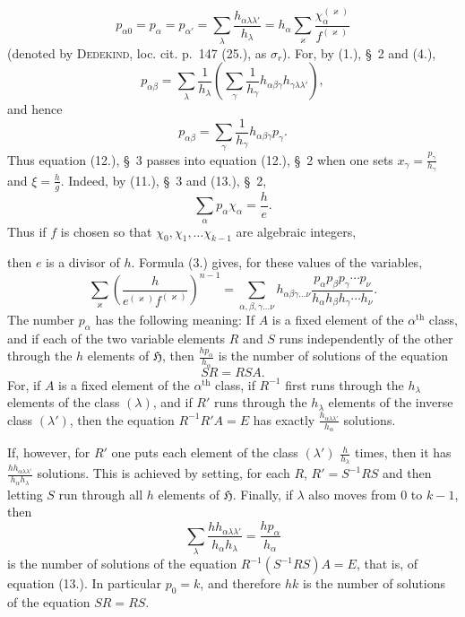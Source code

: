 \documentclass[11pt]{article}
\newcommand{\grp}{\mathfrak{H}}
\begin{document}
\begin{equation*}\tag{9.}
p_{\alpha0}=p_\alpha=p_{\alpha'}=\sum_\lambda\frac{h_{\alpha\lambda\lambda'}}{h_\lambda}=h_\alpha\sum_\varkappa\frac{\chi_\alpha^{(\varkappa)}}{f^{(\varkappa)}}
\end{equation*}
(denoted by \textsc{Dedekind}, loc. cit. p.~147 (25.), as $\sigma_r$). For, by (1.), \S~2 and (4.),
\[
p_{\alpha\beta}=\sum_\lambda\frac{1}{h_\lambda}\left(\sum_\gamma\frac{1}{h_\gamma}h_{\alpha\beta\gamma}h_{\gamma\lambda\lambda'}\right),
\]
and hence
\begin{equation*}\tag{10.}
p_{\alpha\beta}=\sum_\gamma\frac{1}{h_\gamma}h_{\alpha\beta\gamma}p_\gamma.
\end{equation*}
Thus equation (12.), \S~3 passes into equation (12.), \S~2 when one sets $x_\gamma=\frac{p_\gamma}{h_\gamma}$ and $\xi=\frac{h}{g}$. Indeed, by (11.), \S~3 and (13.), \S~2,
\begin{equation*}\tag{11.}
\sum_\alpha p_\alpha\chi_\alpha=\frac{h}{e}.
\end{equation*}
Thus if $f$ is chosen so that $\chi_0,\chi_1,\ldots\chi_{k-1}$ are algebraic integers,


then $e$ is a divisor of $h$. Formula (3.) gives, for these values of the variables,
\begin{equation*}\tag{12.}
\sum_\varkappa\left(\frac{h}{e^{(\varkappa)}f^{(\varkappa)}}\right)^{n-1}
=\sum_{\alpha,\beta,\gamma\ldots\nu}h_{\alpha\beta\gamma\ldots\nu}\frac{p_\alpha p_\beta p_\gamma\cdots p_\nu}{h_\alpha h_\beta h_\gamma\cdots h_\nu}.
\end{equation*}
The number $p_\alpha$ has the following meaning: If $A$ is a fixed element of the $\alpha^{\text{th}}$ class, and if each of the two variable elements $R$ and $S$ runs independently of the other through the $h$ elements of $\grp$, then $\frac{hp_\alpha}{h_\alpha}$ is the number of solutions of the equation
\begin{equation*}\tag{13.}
SR=RSA.
\end{equation*}
For, if $A$ is a fixed element of the $\alpha^{\text{th}}$ class, if $R^{-1}$ first runs through the $h_\lambda$ elements of the class $(\lambda)$, and if $R'$ runs through the $h_\lambda$ elements of the inverse class $(\lambda')$, then the equation $R^{-1}R'A=E$ has exactly $\frac{h_{\alpha\lambda\lambda'}}{h_\alpha}$ solutions.

If, however, for $R'$ one puts each element of the class $(\lambda')$ $\frac{h}{h_\lambda}$ times, then it has $\frac{h h_{\alpha\lambda\lambda'}}{h_\alpha h_\lambda}$ solutions. This is achieved by setting, for each $R$, $R'=S^{-1}RS$ and then letting $S$ run through all $h$ elements of $\grp$. Finally, if $\lambda$ also moves from $0$ to $k-1$, then
\[
\sum_\lambda\frac{h h_{\alpha\lambda\lambda'}}{h_\alpha h_\lambda}=\frac{hp_\alpha}{h_\alpha}
\]
is the number of solutions of the equation $R^{-1}(S^{-1}RS)A=E$, that is, of equation (13.). In particular $p_0=k$, and therefore $hk$ is the number of solutions of the equation $SR=RS$.
\end{document}
